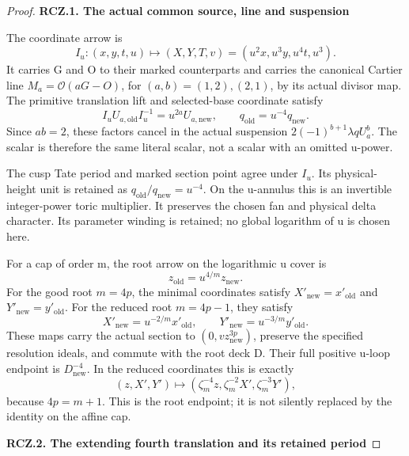 \begin{proof}
\par

\medskip\noindent\textbf{RCZ.1. The actual common source, line and suspension}

\par\nobreak

The coordinate arrow is
\[
 I_u:(x,y,t,u)\longmapsto
 (X,Y,T,v)=(u^2x,u^3y,u^4t,u^3).
\]
It carries G and O to their marked counterparts and carries the
canonical Cartier line \(M_a=\mathcal O(aG-O)\), for
\((a,b)=(1,2),(2,1)\), by its actual divisor map. The primitive
translation lift and selected-base coordinate satisfy
\[
 I_uU_{a,\mathrm{old}}I_u^{-1}=u^{2a}U_{a,\mathrm{new}},
 \qquad q_{\mathrm{old}}=u^{-4}q_{\mathrm{new}}.
\]
Since \(ab=2\), these factors cancel in the actual suspension
\(2(-1)^{b+1}\lambda qU_a^b\). The scalar is therefore the same
literal scalar, not a scalar with an omitted u-power.

The cusp Tate period and marked section point agree under \(I_u\).
Its physical-height unit is retained as
\(q_{\mathrm{old}}/q_{\mathrm{new}}=u^{-4}\). On the u-annulus
this is an invertible integer-power toric multiplier. It preserves
the chosen fan and physical delta character. Its parameter winding
is retained; no global logarithm of u is chosen here.

For a cap of order m, the root arrow on the logarithmic u cover is
\[
 z_{\mathrm{old}}=u^{4/m}z_{\mathrm{new}}.
\]
For the good root \(m=4p\), the minimal coordinates satisfy
\(X'_{\mathrm{new}}=x'_{\mathrm{old}}\) and
\(Y'_{\mathrm{new}}=y'_{\mathrm{old}}\). For the reduced root
\(m=4p-1\), they satisfy
\[
 X'_{\mathrm{new}}=u^{-2/m}x'_{\mathrm{old}},\qquad
 Y'_{\mathrm{new}}=u^{-3/m}y'_{\mathrm{old}}.
\]
These maps carry the actual section to
\((0,vz_{\mathrm{new}}^{3p})\), preserve the specified resolution
ideals, and commute with the root deck D. Their full positive
u-loop endpoint is \(D_{\mathrm{new}}^{-4}\). In the reduced
coordinates this is exactly
\[
 (z,X',Y')\longmapsto
 (\zeta_m^{-4}z,\zeta_m^{-2}X',\zeta_m^{-3}Y'),
\]
because \(4p=m+1\). This is the root endpoint; it is not silently
replaced by the identity on the affine cap.

\par

\medskip\noindent\textbf{RCZ.2. The extending fourth translation and its retained period}

\par\nobreak


\end{proof}

